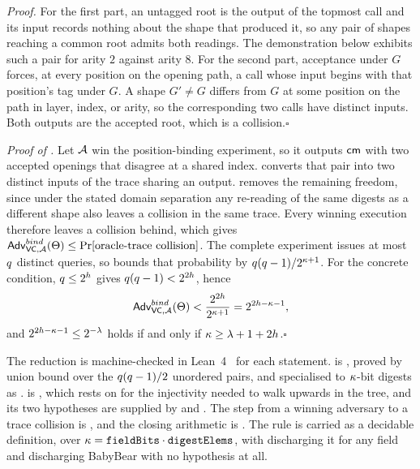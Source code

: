 \noindent\emph{Proof.}
For the first part, an untagged root is the output of the topmost call and its input
records nothing about the shape that produced it, so any pair of shapes reaching a common
root admits both readings.  The demonstration below exhibits such a pair for arity $2$
against arity $8$.  For the second part, acceptance under $G$ forces, at every position
on the opening path, a call whose input begins with that position's tag under $G$.  A
shape $G'\neq G$ differs from $G$ at some position on the path in layer, index, or arity,
so the corresponding two calls have distinct inputs.  Both outputs are the accepted root,
which is a collision.\hfill$\square$

\noindent\emph{Proof of .}
Let $\mathcal{A}$ win the position-binding experiment, so it outputs $\mathsf{cm}$ with two accepted
openings that disagree at a shared index.   converts that pair into two
distinct inputs of the trace sharing an output.   removes the
remaining freedom, since under the stated domain separation any re-reading of the same
digests as a different shape also leaves a collision in the same trace.  Every winning
execution therefore leaves a collision behind, which gives
$\mathsf{Adv}^{bind}_{\mathsf{VC},\mathcal{A}}(\Theta)\le\Pr[\text{oracle-trace collision}]$.  The complete experiment
issues at most $q$ distinct queries, so  bounds that
probability by $q(q-1)/2^{\kappa+1}$.  For the concrete
condition, $q\le2^{h}$ gives
$q(q-1)<2^{2h}$, hence
\[
  \mathsf{Adv}^{bind}_{\mathsf{VC},\mathcal{A}}(\Theta)<\frac{2^{2h}}{2^{\kappa+1}}=2^{2h-\kappa-1},
\]
and $2^{2h-\kappa-1}\le2^{-\lambda}$ holds if and only if
$\kappa\ge\lambda+1+2h$.\hfill$\square$

The reduction is machine-checked in Lean~4~\cite{ZLeanVC26} for each statement.
 is , proved by union bound over the
$q(q-1)/2$ unordered pairs, and specialised to $\kappa$-bit
digests as .   is
, which rests on  for the injectivity needed
to walk upwards in the tree, and its two hypotheses are supplied by
 and .  The step from a winning
adversary to a trace collision is , and the
closing arithmetic is .  The rule is carried as a
decidable definition,  over
$\kappa=\texttt{fieldBits}\cdot\texttt{digestElems}$, with
 discharging it for any field and
 discharging BabyBear with no hypothesis at all.


